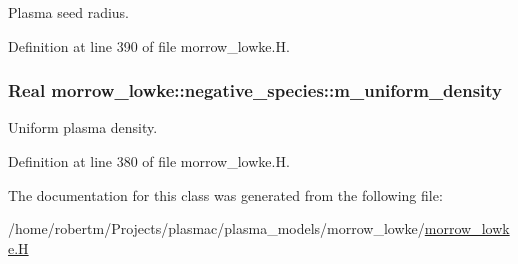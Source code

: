 Plasma seed radius. 



Definition at line 390 of file morrow\+\_\+lowke.\+H.

\subsubsection[{\texorpdfstring{m\+\_\+uniform\+\_\+density}{m_uniform_density}}]{\setlength{\rightskip}{0pt plus 5cm}Real morrow\+\_\+lowke\+::negative\+\_\+species\+::m\+\_\+uniform\+\_\+density}\hypertarget{classmorrow__lowke_1_1negative__species_a965dea6fbcdadf2bb8999220967fe23f}{}\label{classmorrow__lowke_1_1negative__species_a965dea6fbcdadf2bb8999220967fe23f}


Uniform plasma density. 



Definition at line 380 of file morrow\+\_\+lowke.\+H.



The documentation for this class was generated from the following file\+:\begin{DoxyCompactItemize}
\item 
/home/robertm/\+Projects/plasmac/plasma\+\_\+models/morrow\+\_\+lowke/\hyperlink{morrow__lowke_8H}{morrow\+\_\+lowke.\+H}\end{DoxyCompactItemize}
